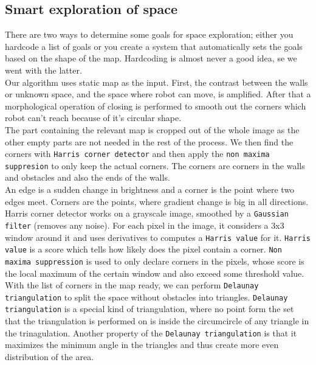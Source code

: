 \documentclass[12pt,a4paper]{article}
\begin{document}
	\subsection{Smart exploration of space} \label{smart_exploration}
	There are two ways to determine some goals for space exploration; either you hardcode a list of goals or you create a system that automatically sets the goals based on the shape of the map. Hardcoding is almost never a good idea, se we went with the latter. \\

	Our algorithm uses static map as the input. First, the contrast between the walls or unknown space, and the space where robot can move, is amplified. After that a morphological operation of closing is performed to smooth out the corners which robot can't reach because of it's circular shape. \\
	
	The part containing the relevant map is cropped out of the whole image as the other empty parts are not needed in the rest of the process. We then find the corners with \texttt{Harris corner detector} and then apply the \texttt{non maxima suppresion} to only keep the actual corners. The corners are corners in the walls and obstacles and also the ends of the walls. \\
	
	An edge is a sudden change in brightness and a corner is the point where two edges meet. Corners are the points, where gradient change is big in all directions. Harris corner detector works on a grayscale image, smoothed by a \texttt{Gaussian filter} (removes any noise). For each pixel in the image, it considers a 3x3 window around it and uses derivatives to computes a \texttt{Harris value} for it. \texttt{Harris value} is a score which tells how likely does the pixel contain a corner. \texttt{Non maxima suppression} is used to only declare corners in the pixels, whose score is the local maximum of the certain window and also exceed some threshold value. \\

	With the list of corners in the map ready, we can perform \texttt{Delaunay triangulation} to split the space without obstacles into triangles. \texttt{Delaunay triangulation} is a special kind of triangulation, where  no point form the set that the triangulation is performed on is inside the circumcircle of any triangle in the trinagulation. Another property of the \texttt{Delaunay triangulation} is that it maximizes the minimum angle in the triangles and thus create more even distribution of the area. \\
\end{document}
